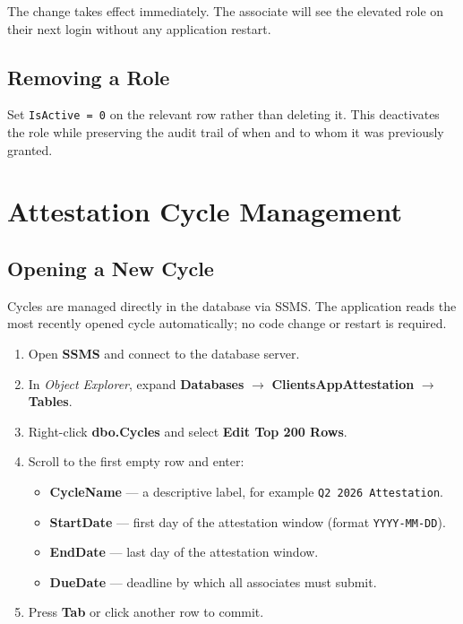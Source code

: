 \documentclass[12pt,a4paper]{report}
\begin{document}
\begin{notebox}
The change takes effect immediately. The associate will see the elevated role on their next
login without any application restart.
\end{notebox}

\section{Removing a Role}

Set \texttt{IsActive = 0} on the relevant row rather than deleting it. This deactivates the
role while preserving the audit trail of when and to whom it was previously granted.

\chapter{Attestation Cycle Management}

\section{Opening a New Cycle}

Cycles are managed directly in the database via SSMS. The application reads the most recently
opened cycle automatically; no code change or restart is required.

\begin{enumerate}
  \item Open \textbf{SSMS} and connect to the database server.
  \item In \emph{Object Explorer}, expand \textbf{Databases} $\to$
        \textbf{ClientsAppAttestation} $\to$ \textbf{Tables}.
  \item Right-click \textbf{dbo.Cycles} and select \textbf{Edit Top 200 Rows}.
  \item Scroll to the first empty row and enter:
  \begin{itemize}
    \item \textbf{CycleName} — a descriptive label, for example
          \texttt{Q2 2026 Attestation}.
    \item \textbf{StartDate} — first day of the attestation window (format
          \texttt{YYYY-MM-DD}).
    \item \textbf{EndDate} — last day of the attestation window.
    \item \textbf{DueDate} — deadline by which all associates must submit.
  \end{itemize}
  \item Press \textbf{Tab} or click another row to commit.
\end{enumerate}
\end{document}
